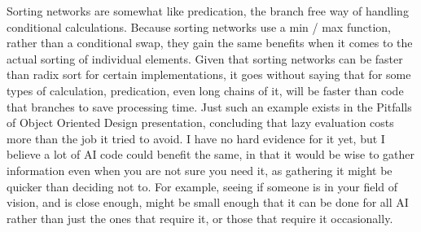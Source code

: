 Sorting networks are somewhat like predication, the branch free way of handling
conditional calculations. Because sorting networks use a min / max function,
rather than a conditional swap, they gain the same benefits when it comes to
the actual sorting of individual elements. Given that sorting networks can be
faster than radix sort for certain implementations, it goes without saying that
for some types of calculation, predication, even long chains of it, will be
faster than code that branches to save processing time. Just such an example
exists in the Pitfalls of Object Oriented Design presentation, concluding that
lazy evaluation costs more than the job it tried to avoid. I have no hard
evidence for it yet, but I believe a lot of AI code could benefit the same, in
that it would be wise to gather information even when you are not sure you need
it, as gathering it might be quicker than deciding not to. For example, seeing
if someone is in your field of vision, and is close enough, might be small
enough that it can be done for all AI rather than just the ones that require
it, or those that require it occasionally.

